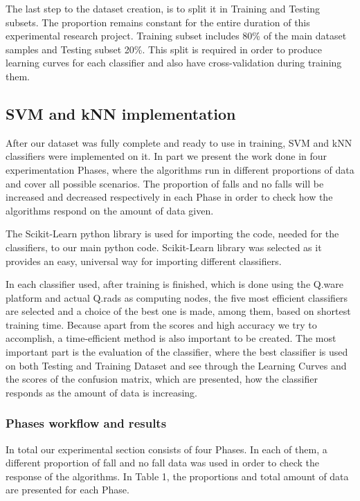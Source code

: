\documentclass[10pt, conference, compsocconf]{IEEEtran}
\begin{document}
The last step to the dataset creation, is to split it in Training and Testing subsets. The proportion remains constant for the entire duration of this experimental research project. Training subset includes 80\% of the main dataset samples and Testing subset 20\%. This split is required in order to produce learning curves for each classifier and also have cross-validation during training them.

\subsection{SVM and kNN implementation}

After our dataset was fully complete and ready to use in training, SVM and kNN classifiers were implemented on it. In part we present the work done in four experimentation Phases, where the algorithms run in different proportions of data and cover all possible scenarios. The proportion of falls and no falls will be increased and decreased respectively in each Phase in order to check how the algorithms respond on the amount of data given.

The Scikit-Learn python library is used for importing the code, needed for the classifiers, to our main python code. Scikit-Learn library was selected as it provides an easy, universal way for importing different classifiers. 

In each classifier used, after training is finished, which is done using the Q.ware platform and actual Q.rads as computing nodes, the five most efficient classifiers are selected and a choice of the best one is made, among them, based on shortest training time. Because apart from the scores and high accuracy we try to accomplish, a time-efficient method is also important to be created. The most important part is the evaluation of the classifier, where the best classifier is used on both Testing and Training Dataset and see through the Learning Curves and the scores of the confusion matrix, which are presented, how the classifier responds as the amount of data is increasing. 

\subsubsection{Phases workflow and results}

In total our experimental section consists of four Phases. In each of them, a different proportion of fall and no fall data was used in order to check the response of the algorithms. In Table 1, the proportions and total amount of data are presented for each Phase. 
\end{document}
